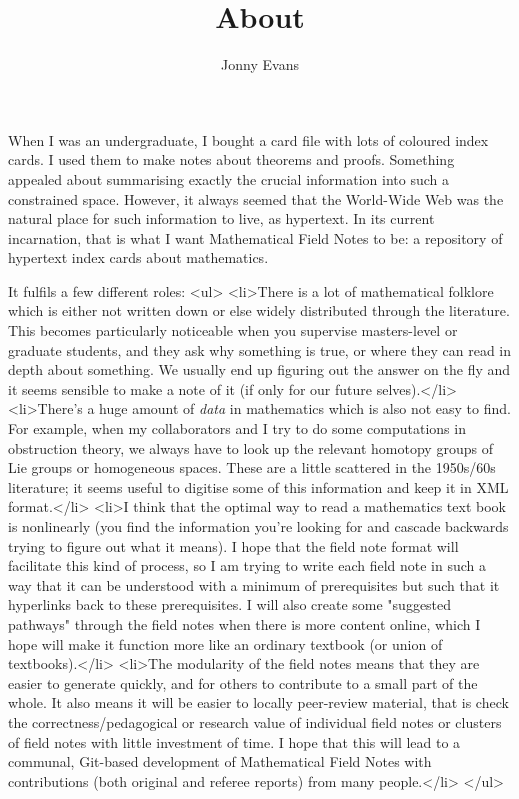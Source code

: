 \documentclass{amsart}
\title{About}
\author{Jonny Evans}
\begin{document}
When I was an undergraduate, I bought a card file with lots of coloured index cards. I used them to make notes about theorems and proofs. Something appealed about summarising exactly the crucial information into such a constrained space. However, it always seemed that the World-Wide Web was the natural place for such information to live, as hypertext. In its current incarnation, that is what I want Mathematical Field Notes to be: a repository of hypertext index cards about mathematics.

It fulfils a few different roles:
<ul>
<li>There is a lot of mathematical folklore which is either not written down or else widely distributed through the literature. This becomes particularly noticeable when you supervise masters-level or graduate students, and they ask why something is true, or where they can read in depth about something. We usually end up figuring out the answer on the fly and it seems sensible to make a note of it (if only for our future selves).</li>
<li>There's a huge amount of {\em data} in mathematics which is also not easy to find. For example, when my collaborators and I try to do some computations in obstruction theory, we always have to look up the relevant homotopy groups of Lie groups or homogeneous spaces. These are a little scattered in the 1950s/60s literature; it seems useful to digitise some of this information and keep it in XML format.</li>
<li>I think that the optimal way to read a mathematics text book is nonlinearly (you find the information you're looking for and cascade backwards trying to figure out what it means). I hope that the field note format will facilitate this kind of process, so I am trying to write each field note in such a way that it can be understood with a minimum of prerequisites but such that it hyperlinks back to these prerequisites. I will also create some "suggested pathways" through the field notes when there is more content online, which I hope will make it function more like an ordinary textbook (or union of textbooks).</li>
<li>The modularity of the field notes means that they are easier to generate quickly, and for others to contribute to a small part of the whole. It also means it will be easier to locally peer-review material, that is check the correctness/pedagogical or research value of individual field notes or clusters of field notes with little investment of time. I hope that this will lead to a communal, Git-based development of Mathematical Field Notes with contributions (both original and referee reports) from many people.</li>
</ul>
\end{document}
